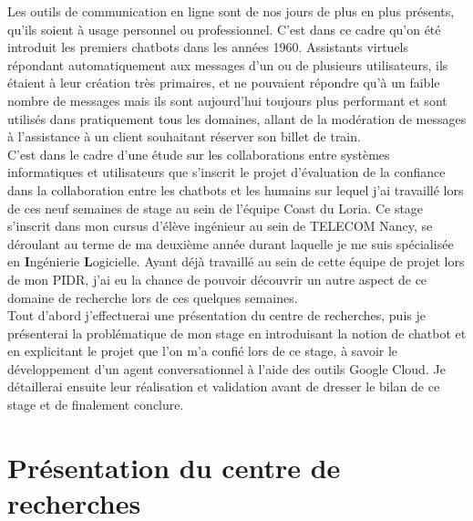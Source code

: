 \documentclass[stage2a]{tnreport} %
\begin{document}
Les outils de communication en ligne sont de nos jours de plus en plus présents, qu'ils soient à usage personnel ou professionnel. C'est dans ce cadre qu'on été introduit les premiers chatbots dans les années 1960. Assistants virtuels répondant automatiquement aux messages d'un ou de plusieurs utilisateurs, ils étaient à leur création très primaires, et ne pouvaient répondre qu'à un faible nombre de messages mais ils sont aujourd'hui toujours plus performant et sont utilisés dans pratiquement tous les domaines, allant de la modération de messages à l'assistance à un client souhaitant réserver son billet de train. \\

C'est dans le cadre d'une étude sur les collaborations entre systèmes informatiques et utilisateurs que s'inscrit le projet d'évaluation de la confiance dans la collaboration entre les chatbots et les humains sur lequel j'ai travaillé lors de ces neuf semaines de stage au sein de l'équipe Coast du Loria. Ce stage s'inscrit dans mon cursus d'élève ingénieur au sein de TELECOM Nancy, se déroulant au terme de ma deuxième année durant laquelle je me suis spécialisée en \textbf{I}ngénierie \textbf{L}ogicielle. Ayant déjà travaillé au sein de cette équipe de projet lors de mon PIDR, j'ai eu la chance de pouvoir découvrir un autre aspect de ce domaine de recherche lors de ces quelques semaines. \\

Tout d'abord j'effectuerai une présentation du centre de recherches, puis je présenterai la problématique de mon stage en introduisant la notion de chatbot et en explicitant le projet que l'on m'a confié lors de ce stage, à savoir le développement d'un agent conversationnel à l'aide des outils Google Cloud. Je détaillerai ensuite leur réalisation et validation avant de dresser le bilan de ce stage et de finalement conclure.\\



\clearpage

\chapter{Présentation du centre de recherches}

\end{document}
